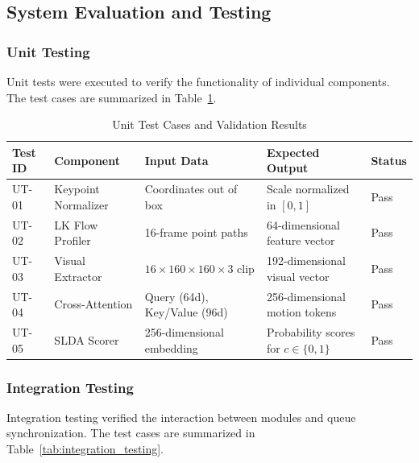 \documentclass[12pt]{article}
\begin{document}
\clearpage
\subsection{System Evaluation and Testing}

\subsubsection{Unit Testing}
Unit tests were executed to verify the functionality of individual components. The test cases are summarized in Table~\ref{tab:unit_testing}.

\begin{table}[H]
    \centering
    \caption{Unit Test Cases and Validation Results}
    \label{tab:unit_testing}
    \small
    \begin{tabular}{lp{3.5cm}p{4cm}p{4cm}l}
        \toprule
        \textbf{Test ID} & \textbf{Component} & \textbf{Input Data} & \textbf{Expected Output} & \textbf{Status} \\
        \midrule
        UT-01 & Keypoint Normalizer & Coordinates out of box & Scale normalized in $[0, 1]$ & Pass \\
        UT-02 & LK Flow Profiler & 16-frame point paths & 64-dimensional feature vector & Pass \\
        UT-03 & Visual Extractor & $16\times160\times160\times3$ clip & 192-dimensional visual vector & Pass \\
        UT-04 & Cross-Attention & Query (64d), Key/Value (96d) & 256-dimensional motion tokens & Pass \\
        UT-05 & SLDA Scorer & 256-dimensional embedding & Probability scores for $c \in \{0, 1\}$ & Pass \\
        \bottomrule
    \end{tabular}
\end{table}

\subsubsection{Integration Testing}
Integration testing verified the interaction between modules and queue synchronization. The test cases are summarized in Table~\ref{tab:integration_testing}.
\end{document}
